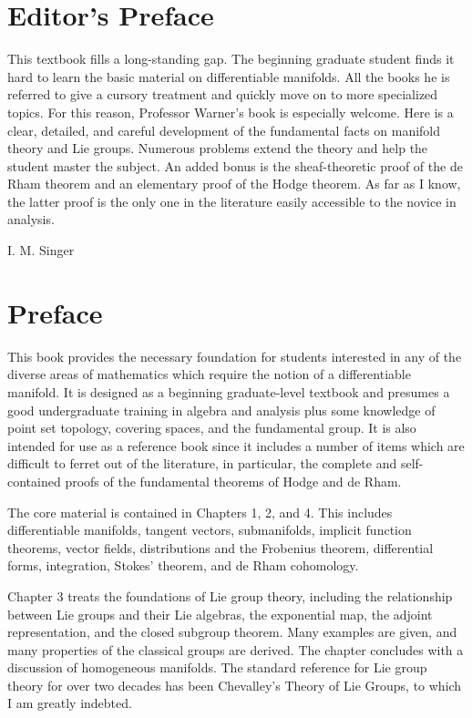 \chapter*{Editor's Preface}

This textbook fills a long-standing gap. The beginning graduate student finds it hard to learn the basic material on differentiable manifolds. All the books he is referred to give a cursory treatment and quickly move on to more specialized topics. For this reason, Professor Warner's book is especially welcome. Here is a clear, detailed, and careful development of the fundamental facts on manifold theory and Lie groups. Numerous problems extend the theory and help the student master the subject. An added bonus is the sheaf-theoretic proof of the de Rham theorem and an elementary proof of the Hodge theorem. As far as I know, the latter proof is the only one in the literature easily accessible to the novice in analysis.

\begin{flushright}
I. M. Singer
\end{flushright}

\chapter*{Preface}

This book provides the necessary foundation for students interested in any of the diverse areas of mathematics which require the notion of a differentiable manifold. It is designed as a beginning graduate-level textbook and presumes a good undergraduate training in algebra and analysis plus some knowledge of point set topology, covering spaces, and the fundamental group. It is also intended for use as a reference book since it includes a number of items which are difficult to ferret out of the literature, in particular, the complete and self-contained proofs of the fundamental theorems of Hodge and de Rham.

The core material is contained in Chapters 1, 2, and 4. This includes differentiable manifolds, tangent vectors, submanifolds, implicit function theorems, vector fields, distributions and the Frobenius theorem, differential forms, integration, Stokes' theorem, and de Rham cohomology.

Chapter 3 treats the foundations of Lie group theory, including the relationship between Lie groups and their Lie algebras, the exponential map, the adjoint representation, and the closed subgroup theorem. Many examples are given, and many properties of the classical groups are derived. The chapter concludes with a discussion of homogeneous manifolds. The standard reference for Lie group theory for over two decades has been Chevalley's Theory of Lie Groups, to which I am greatly indebted.

